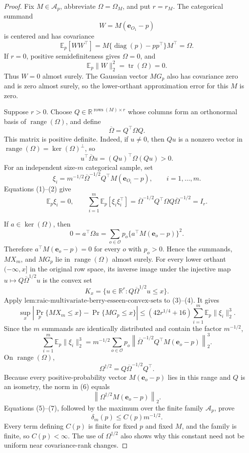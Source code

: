 \documentclass{article}
\begin{document}
\begin{proof}
Fix \(M\in\mathcal A_p\), abbreviate \(\Omega=\Omega_M\), and put \(r=r_M\).  The categorical summand
\[
W=M(\mathbf e_{O_1}-p)
\]
is centered and has covariance
\[
\mathbb E_p[WW^{\top}]
=M\{\operatorname{diag}(p)-pp^{\top}\}M^{\top}=\Omega.
\tag{1}
\]
If \(r=0\), positive semidefiniteness gives \(\Omega=0\), and
\[
\mathbb E_p\|W\|_2^2=\operatorname{tr}(\Omega)=0.
\]
Thus \(W=0\) almost surely.  The Gaussian vector \(MG_p\) also has covariance zero and is zero almost surely, so the lower-orthant approximation error for this \(M\) is zero.

Suppose \(r>0\).  Choose \(Q\in\mathbb R^{\operatorname{rows}(M)\times r}\) whose columns form an orthonormal basis of \(\operatorname{range}(\Omega)\), and define
\[
\overline\Omega=Q^{\top}\Omega Q.
\]
This matrix is positive definite.  Indeed, if \(u\neq0\), then \(Qu\) is a nonzero vector in \(\operatorname{range}(\Omega)=\ker(\Omega)^{\perp}\), so
\[
u^{\top}\overline\Omega u=(Qu)^{\top}\Omega(Qu)>0.
\tag{2}
\]
For an independent size-\(m\) categorical sample, set
\[
\xi_i=m^{-1/2}\overline\Omega^{-1/2}Q^{\top}M(\mathbf e_{O_i}-p),
\qquad i=1,\ldots,m.
\]
Equations (1)--(2) give
\[
\mathbb E_p\xi_i=0,
\qquad
\sum_{i=1}^m\mathbb E_p[\xi_i\xi_i^{\top}]
=\overline\Omega^{-1/2}Q^{\top}\Omega Q\overline\Omega^{-1/2}=I_r.
\tag{3}
\]

If \(a\in\ker(\Omega)\), then
\[
0=a^{\top}\Omega a=\sum_{o\in\mathcal O}p_o
\{a^{\top}M(\mathbf e_o-p)\}^2.
\]
Therefore \(a^{\top}M(\mathbf e_o-p)=0\) for every \(o\) with \(p_o>0\).  Hence the summands, \(MX_m\), and \(MG_p\) lie in \(\operatorname{range}(\Omega)\) almost surely.  For every lower orthant \(( -\infty,x]\) in the original row space, its inverse image under the injective map \(u\mapsto Q\overline\Omega^{1/2}u\) is the convex set
\[
K_x=\{u\in\mathbb R^r:Q\overline\Omega^{1/2}u\leq x\}.
\tag{4}
\]
Apply \(\text{lem:raic-multivariate-berry-esseen-convex-sets}\) to (3)--(4).  It gives
\[
\sup_x\left|\Pr_p\{MX_m\leq x\}-\Pr\{MG_p\leq x\}\right|
\leq(42r^{1/4}+16)\sum_{i=1}^m\mathbb E_p\|\xi_i\|_2^3.
\tag{5}
\]
Since the \(m\) summands are identically distributed and contain the factor \(m^{-1/2}\),
\[
\sum_{i=1}^m\mathbb E_p\|\xi_i\|_2^3
=m^{-1/2}\sum_{o\in\mathcal O}p_o
\left\|\overline\Omega^{-1/2}Q^{\top}M(\mathbf e_o-p)\right\|_2^3.
\tag{6}
\]
On \(\operatorname{range}(\Omega)\),
\[
\Omega^{\dagger/2}=Q\overline\Omega^{-1/2}Q^{\top}.
\]
Because every positive-probability vector \(M(\mathbf e_o-p)\) lies in this range and \(Q\) is an isometry, the norm in (6) equals
\[
\left\|\Omega^{\dagger/2}M(\mathbf e_o-p)\right\|_2.
\tag{7}
\]
Equations (5)--(7), followed by the maximum over the finite family \(\mathcal A_p\), prove
\[
\delta_m(p)\leq C(p)m^{-1/2}.
\tag{8}
\]
Every term defining \(C(p)\) is finite for fixed \(p\) and fixed \(M\), and the family is finite, so \(C(p)<\infty\).  The use of \(\Omega^{\dagger/2}\) also shows why this constant need not be uniform near covariance-rank changes.


\end{proof}
\end{document}
